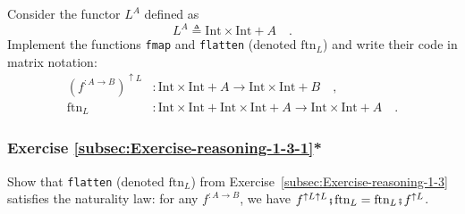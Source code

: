 Consider the functor $L^{A}$ defined as 
\[
L^{A}\triangleq\text{Int}\times\text{Int}+A\quad.
\]
Implement the functions \lstinline!fmap! and \lstinline!flatten!
(denoted $\text{ftn}_{L}$) and write their code in matrix notation:
\begin{align*}
(f^{:A\rightarrow B})^{\uparrow L} & :\text{Int}\times\text{Int}+A\rightarrow\text{Int}\times\text{Int}+B\quad,\\
\text{ftn}_{L} & :\text{Int}\times\text{Int}+\text{Int}\times\text{Int}+A\rightarrow\text{Int}\times\text{Int}+A\quad.
\end{align*}


\subsubsection{Exercise \label{subsec:Exercise-reasoning-1-3-1}\ref{subsec:Exercise-reasoning-1-3-1}{*}}

Show that \lstinline!flatten! (denoted $\text{ftn}_{L}$) from Exercise~\ref{subsec:Exercise-reasoning-1-3}
satisfies the naturality law: for any $f^{:A\rightarrow B}$, we have
$f^{\uparrow L\uparrow L}\bef\text{ftn}_{L}=\text{ftn}_{L}\bef f^{\uparrow L}$.

